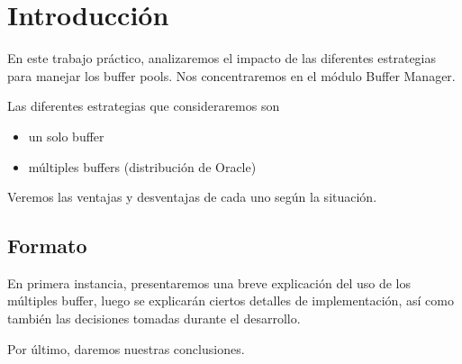 \section{Introducci\'on}

En este trabajo pr\'actico, analizaremos el impacto de las diferentes
estrategias para manejar los buffer pools.
Nos concentraremos en el m\'odulo Buffer Manager.

\vspace*{0.3cm}

Las diferentes estrategias que consideraremos son

\begin{itemize}
    \item
            un solo buffer
    \item
            múltiples buffers (distribución de Oracle)    
\end{itemize}

\vspace*{0.3cm}

Veremos las ventajas y desventajas de cada uno seg\'un la situaci\'on.

\subsection{Formato}

\vspace*{0.3cm}

En primera instancia, presentaremos una breve explicación
del uso de los múltiples buffer, luego se explicar\'an ciertos 
detalles de implementaci\'on, as\'i como tambi\'en las decisiones 
tomadas durante el desarrollo.

Por \'ultimo, daremos nuestras conclusiones.

